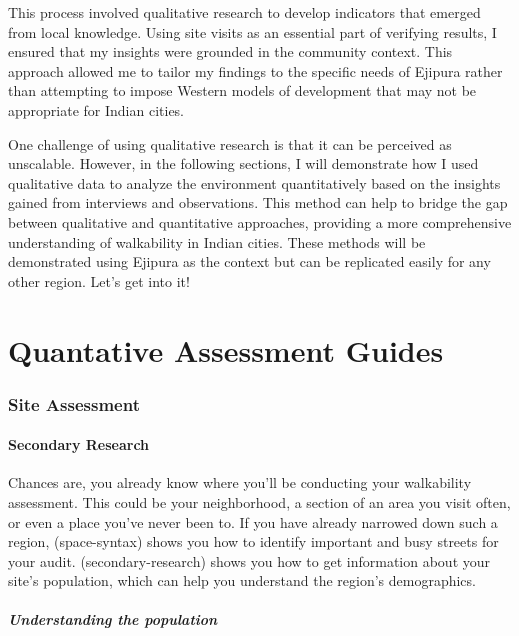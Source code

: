 \documentclass[
]{latex/krantz}
\begin{document}
This process involved qualitative research to develop indicators that emerged from local knowledge. Using site visits as an essential part of verifying results, I ensured that my insights were grounded in the community context. This approach allowed me to tailor my findings to the specific needs of Ejipura rather than attempting to impose Western models of development that may not be appropriate for Indian cities.

One challenge of using qualitative research is that it can be perceived as unscalable. However, in the following sections, I will demonstrate how I used qualitative data to analyze the environment quantitatively based on the insights gained from interviews and observations. This method can help to bridge the gap between qualitative and quantitative approaches, providing a more comprehensive understanding of walkability in Indian cities. These methods will be demonstrated using Ejipura as the context but can be replicated easily for any other region. Let's get into it!

\hypertarget{part-quantative-assessment-guides}{%
\part{Quantative Assessment Guides}\label{part-quantative-assessment-guides}}

\hypertarget{site-assessment}{%
\section{Site Assessment}\label{site-assessment}}

\hypertarget{secondary-research}{%
\subsection{Secondary Research}\label{secondary-research}}

Chances are, you already know where you'll be conducting your walkability assessment. This could be your neighborhood, a section of an area you visit often, or even a place you've never been to. If you have already narrowed down such a region, \textcite{ref}(space-syntax) shows you how to identify important and busy streets for your audit. \textcite{ref}(secondary-research) shows you how to get information about your site's population, which can help you understand the region's demographics.

\hypertarget{understanding-the-population}{%
\subsubsection{Understanding the population}\label{understanding-the-population}}
\end{document}

